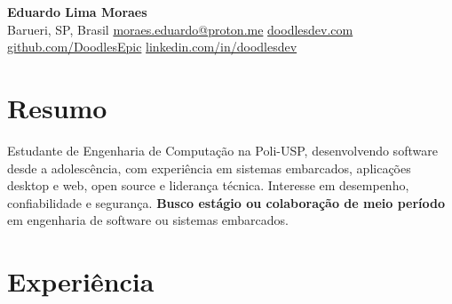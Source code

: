 \documentclass[10pt,a4paper]{article}
\begin{document}
\enlargethispage{3\baselineskip}

\begin{center}
  {\huge\bfseries Eduardo Lima Moraes}\\[4pt]
  {\small
    Barueri, SP, Brasil \;\textbar\;
    \href{mailto:moraes.eduardo@proton.me}{moraes.eduardo@proton.me} \;\textbar\;
    \href{https://www.doodlesdev.com}{doodlesdev.com}\\[1pt]
    \href{https://github.com/DoodlesEpic}{github.com/DoodlesEpic} \;\textbar\;
    \href{https://www.linkedin.com/in/doodlesdev/}{linkedin.com/in/doodlesdev}
  }
\end{center}

\vspace{0pt}

\section{Resumo}
Estudante de Engenharia de Computação na Poli-USP, desenvolvendo software desde a adolescência, com experiência em sistemas embarcados, aplicações desktop e web, open source e liderança técnica. Interesse em desempenho, confiabilidade e segurança. \textbf{Busco estágio ou colaboração de meio período} em engenharia de software ou sistemas embarcados.


\section{Experiência}
\end{document}
